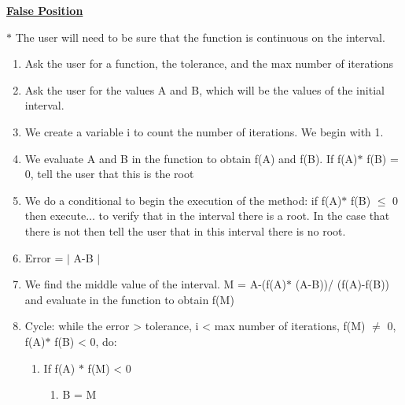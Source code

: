 \documentclass[10pt]{article}
\renewcommand{\_}{\kern-1.5pt\textunderscore\kern-1.5pt}
\begin{document}
\textbf{\uline{False Position }}\par

$\ast$ The user will need to be sure that the function is continuous on the interval. \par

\begin{enumerate}
	\item Ask the user for a function, the tolerance, and the max number of iterations\par

	\item Ask the user for the values A\textbf{ }and B, which will be the values of the initial interval.\par

	\item We create a variable i to count the number of iterations. We begin with 1. \par

	\item We evaluate A\textbf{ }and B in the function to obtain f(A) and f(B). If f(A)$\ast$ f(B) = 0, tell the user that this is the root\par

	\item We do a conditional to begin the execution of the method: if f(A)$\ast$ f(B) $ \leq $  0 then execute$ \ldots $  to verify that in the interval there is a root. In the case that there is not then tell the user that in this interval there is no root.\par

	\item Error = $ \vert $ A-B $ \vert $ \par

	\item We find the middle value of the interval. M = A-(f(A)$\ast$ (A-B))/ (f(A)-f(B)) and evaluate in the function to obtain f(M)\par

	\item Cycle: while the error > tolerance, i < max number of iterations, f(M) $ \neq $  0, f(A)$\ast$ f(B) < 0, do:\par

\begin{enumerate}
	\item If f(A) $\ast$  f(M) < 0\par

\begin{enumerate}
	\item B = M \par


\end{enumerate}
\end{enumerate}
\end{enumerate}
\end{document}
